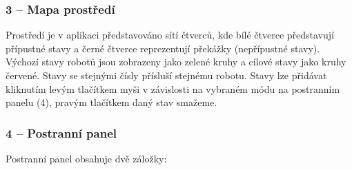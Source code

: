 \subsubsection{3 -- Mapa prostředí}
Prostředí je v aplikaci představováno sítí čtverců, kde bílé čtverce představují přípustné stavy a černé čtverce reprezentují překážky (nepřípustné stavy). Výchozí stavy robotů jsou zobrazeny jako zelené kruhy a cílové stavy jako kruhy červené. Stavy se stejnými čísly přísluší stejnému robotu. Stavy lze přidávat kliknutím levým tlačítkem myši v závislosti na vybraném módu na postranním panelu (4), pravým tlačítkem daný stav smažeme.

\subsubsection{4 -- Postranní panel}
Postranní panel obsahuje dvě záložky:
